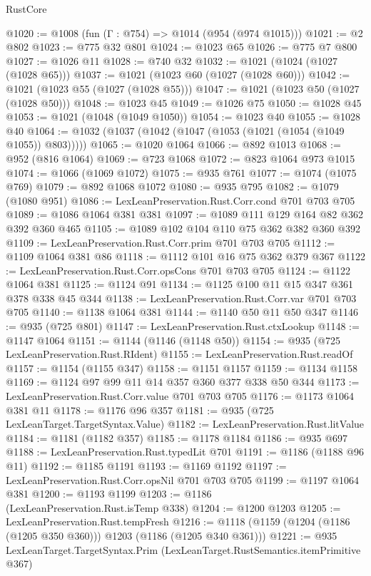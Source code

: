 \begin{lexlean}{RustCore}
\begin{coremodule}
@1020 := @1008 (fun (Γ : @754) => @1014 (@954 (@974 @1015)))
@1021 := @2 @802
@1023 := @775 @32 @801
@1024 := @1023 @65
@1026 := @775 @7 @800
@1027 := @1026 @11
@1028 := @740 @32
@1032 := @1021 (@1024 (@1027 (@1028 @65)))
@1037 := @1021 (@1023 @60 (@1027 (@1028 @60)))
@1042 := @1021 (@1023 @55 (@1027 (@1028 @55)))
@1047 := @1021 (@1023 @50 (@1027 (@1028 @50)))
@1048 := @1023 @45
@1049 := @1026 @75
@1050 := @1028 @45
@1053 := @1021 (@1048 (@1049 @1050))
@1054 := @1023 @40
@1055 := @1028 @40
@1064 := @1032 (@1037 (@1042 (@1047 (@1053 (@1021 (@1054 (@1049 @1055)) @803)))))
@1065 := @1020 @1064
@1066 := @892 @1013
@1068 := @952 (@816 @1064)
@1069 := @723 @1068
@1072 := @823 @1064 @973 @1015
@1074 := @1066 (@1069 @1072)
@1075 := @935 @761
@1077 := @1074 (@1075 @769)
@1079 := @892 @1068 @1072
@1080 := @935 @795
@1082 := @1079 (@1080 @951)
@1086 := LexLeanPreservation.Rust.Corr.cond @701 @703 @705
@1089 := @1086 @1064 @381 @381
@1097 := @1089 @111 @129 @164 @82 @362 @392 @360 @465
@1105 := @1089 @102 @104 @110 @75 @362 @382 @360 @392
@1109 := LexLeanPreservation.Rust.Corr.prim @701 @703 @705
@1112 := @1109 @1064 @381 @86
@1118 := @1112 @101 @16 @75 @362 @379 @367
@1122 := LexLeanPreservation.Rust.Corr.opsCons @701 @703 @705
@1124 := @1122 @1064 @381
@1125 := @1124 @91
@1134 := @1125 @100 @11 @15 @347 @361 @378 @338 @45 @344
@1138 := LexLeanPreservation.Rust.Corr.var @701 @703 @705
@1140 := @1138 @1064 @381
@1144 := @1140 @50 @11 @50 @347
@1146 := @935 (@725 @801)
@1147 := LexLeanPreservation.Rust.ctxLookup
@1148 := @1147 @1064
@1151 := @1144 (@1146 (@1148 @50))
@1154 := @935 (@725 LexLeanPreservation.Rust.RIdent)
@1155 := LexLeanPreservation.Rust.readOf
@1157 := @1154 (@1155 @347)
@1158 := @1151 @1157
@1159 := @1134 @1158
@1169 := @1124 @97 @99 @11 @14 @357 @360 @377 @338 @50 @344
@1173 := LexLeanPreservation.Rust.Corr.value @701 @703 @705
@1176 := @1173 @1064 @381 @11
@1178 := @1176 @96 @357
@1181 := @935 (@725 LexLeanTarget.TargetSyntax.Value)
@1182 := LexLeanPreservation.Rust.litValue
@1184 := @1181 (@1182 @357)
@1185 := @1178 @1184
@1186 := @935 @697
@1188 := LexLeanPreservation.Rust.typedLit @701
@1191 := @1186 (@1188 @96 @11)
@1192 := @1185 @1191
@1193 := @1169 @1192
@1197 := LexLeanPreservation.Rust.Corr.opsNil @701 @703 @705
@1199 := @1197 @1064 @381
@1200 := @1193 @1199
@1203 := @1186 (LexLeanPreservation.Rust.isTemp @338)
@1204 := @1200 @1203
@1205 := LexLeanPreservation.Rust.tempFresh
@1216 := @1118 (@1159 (@1204 (@1186 (@1205 @350 @360))) @1203 (@1186 (@1205 @340 @361)))
@1221 := @935 LexLeanTarget.TargetSyntax.Prim (LexLeanTarget.RustSemantics.itemPrimitive @367)

\end{coremodule}
\end{lexlean}
